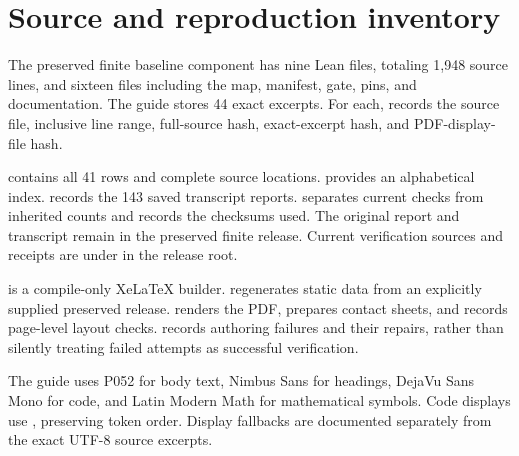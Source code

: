 \section{Source and reproduction inventory}
The preserved finite baseline component has nine Lean files, totaling 1,948 source lines, and sixteen files including the map, manifest, gate, pins, and documentation. The guide stores 44 exact excerpts. For each,  records the source file, inclusive line range, full-source hash, exact-excerpt hash, and PDF-display-file hash.

 contains all 41 rows and complete source locations.  provides an alphabetical index.  records the 143 saved transcript reports.  separates current checks from inherited counts and records the checksums used. The original report and transcript remain in the preserved finite release. Current verification sources and receipts are under  in the release root.

 is a compile-only XeLaTeX builder.  regenerates static data from an explicitly supplied preserved release.  renders the PDF, prepares contact sheets, and records page-level layout checks.  records authoring failures and their repairs, rather than silently treating failed attempts as successful verification.

The guide uses P052 for body text, Nimbus Sans for headings, DejaVu Sans Mono for code, and Latin Modern Math for mathematical symbols. Code displays use , preserving token order. Display fallbacks are documented separately from the exact UTF-8 source excerpts.

